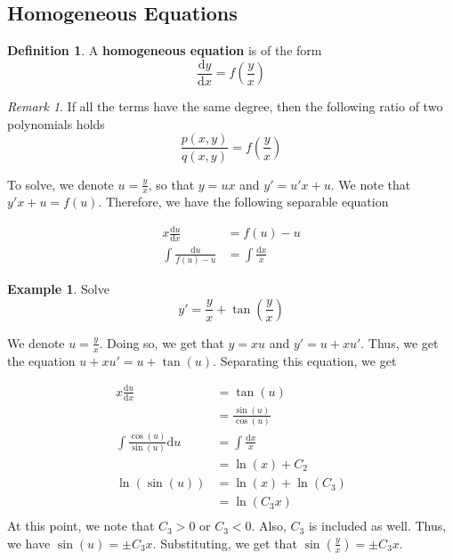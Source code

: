 \documentclass[11pt]{article}
\theoremstyle{plain} %
\theoremstyle{definition}
\newtheorem*{definition}{Definition} %
\theoremstyle{example}
\newtheorem*{example}{Example}
\theoremstyle{remark}
\newtheorem*{remark}{Remark}
\begin{document}
\subsection{Homogeneous Equations}

\begin{definition}
A \textbf{homogeneous equation} is of the form $$\frac{\mathrm d y}{\mathrm d x} = f\left(\frac{y}{x}\right)$$
\end{definition}

\begin{remark}
If all the terms have the same degree, then the following ratio of two polynomials holds$$\frac{p(x,y)}{q(x,y)} = f\left(\frac{y}{x}\right)$$ \end{remark}

To solve, we denote $u = \frac{y}{x}$, so that $y = ux$ and $y' = u'x+u$. We note that $y'x+u = f(u)$. Therefore, we have the following separable equation

\begin{align*}
x\frac{\mathrm d u }{\mathrm d x} &= f(u) - u\\
\int \frac{\mathrm d u}{f(u)-u} &= \int \frac{\mathrm d x}{x}
\end{align*}


\begin{example}
Solve $$y' = \frac{y}{x} + \tan\left(\frac{y}{x}\right)$$
\end{example}

We denote $u = \frac{y}{x}$. Doing so, we get that $y = xu$ and $y' = u + xu'$. Thus, we get the equation $u + xu' = u + \tan(u)$. Separating this equation, we get









\begin{align*}
x\frac{\mathrm d u}{\mathrm d x} &= \tan(u) \\
&= \frac{\sin(u)}{\cos(u)} \\
\int \frac{\cos(u)}{\sin(u)}\mathrm d u &= \int \frac{\mathrm d x}{x} \\
&= \ln(x) + C_2\\
\ln(\sin(u)) &= \ln(x)+\ln(C_3)\\
&= \ln(C_3x)\\
\end{align*}
At this point, we note that $C_3 > 0$ or $C_3 < 0$. Also, $C_3$ is included as well. Thus, we have $\sin(u) = \pm C_3x$. Substituting, we get that $\sin\left(\frac{y}{x}\right) = \pm C_3x$. 
\end{document}
